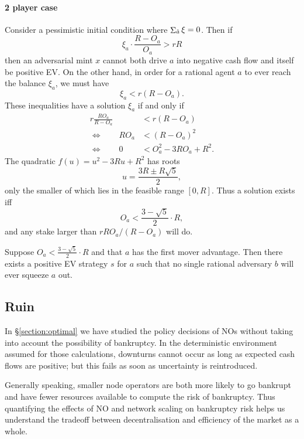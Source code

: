 \paragraph{2 player case}
Consider a pessimistic initial condition where $\mathop{\Sigma}_{\hat{a}}\xi=0$.
%
Then if
\[
  \xi_a\cdot\frac{R-O_a}{O_a} > rR
\]
then an adversarial mint $x$ cannot both drive $a$ into negative cash flow and itself be positive EV.
%
On the other hand, in order for a rational agent $a$ to ever reach the balance $\xi_a$, we must have
\[
  \xi_a< r(R-O_a).
\]
These inequalities have a solution $\xi_a$ if and only if
\begin{align*}
  r\frac{RO_a} {R-O_a} &< r(R-O_a) \\
  \Leftrightarrow \qquad RO_a &< (R-O_a)^2  \\
  \Leftrightarrow \qquad 0 &< O_a^2 - 3RO_a + R^2.
\end{align*}
The quadratic $f(u) = u^2 - 3Ru + R^2$ has roots
\[
  u = \frac{3R \pm R\sqrt{5}} {2},
\]
only the smaller of which lies in the feasible range $[0,R]$.
%
Thus a solution exists iff
\[
  O_a < \frac{3-\sqrt {5}}{2} \cdot R,
\]
and any stake larger than $rRO_a/(R-O_a)$ will do.

\begin{proposition}[No squeezing]
  \label{thm:no-squeeze}
  
  Suppose $O_a< \frac{3-\sqrt {5}}{2} \cdot R$ and that $a$ has the first mover advantage.
  Then there exists a positive EV strategy $s$ for $a$ such that no single rational adversary $b$ will ever squeeze $a$ out.

\end{proposition}



\subsection{Ruin}
\label{section:risk}

In \S\ref{section:optimal} we have studied the policy decisions of NOs without taking into account the possibility of bankruptcy.
%
In the deterministic environment assumed for those calculations, downturns cannot occur as long as expected cash flows are positive; but this fails as soon as uncertainty is reintroduced.

Generally speaking, smaller node operators are both more likely to go bankrupt and have fewer resources available to compute the risk of bankruptcy.
%
Thus quantifying the effects of NO and network scaling on bankruptcy risk helps us understand the tradeoff between decentralisation and efficiency of the market as a whole.


